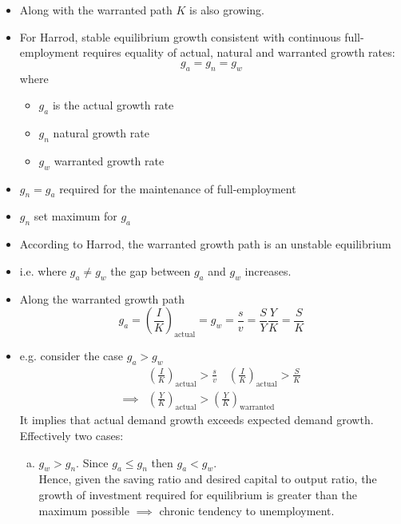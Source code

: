 \documentclass[a4paper,twoside]{article}
\numberwithin{equation}{section}
\numberwithin{figure}{section}
\begin{document}
\begin{itemize}
		\item Along with the warranted path \( K \) is also growing.
		\item For Harrod, stable equilibrium growth consistent with continuous full-employment requires equality of actual, natural and warranted growth rates:
		\begin{equation}
			g_a = g_n = g_w \label{eq:2.8}
		\end{equation}
		where
		\begin{itemize}
			\item \( g_a \) is the actual growth rate
			\item \( g_n \) natural growth rate
			\item \( g_w \) warranted growth rate
		\end{itemize}
		\item \( g_n = g_a \) required for the maintenance of full-employment
		\item \( g_n \) set maximum for \( g_a \)\\
		\item According to Harrod, the warranted growth path is an unstable equilibrium
		\item i.e. where \( g_a \neq g_w \) the gap between \( g_a \) and \( g_w \) increases.
		\item Along the warranted growth path
		\begin{equation}
			g_a = \left( \frac{I}{K} \right)_{\text{actual}} = g_w = \frac{s}{v} = \frac{S}{Y} \frac{Y}{K} = \frac{S}{K} \label{eq:2.9}
		\end{equation}
		\item e.g. consider the case \( g_a > g_w \) 
		\begin{align*}
			&\left( \frac{I}{K} \right)_{\text{actual}} > \frac{s}{v} \quad \left( \frac{I}{K} \right)_{\text{actual}} > \frac{S}{K} \\ 
			\implies &\left( \frac{Y}{K} \right)_{\text{actual}} > \left( \frac{Y}{K} \right)_{\text{warranted}}
		\end{align*}
		It implies that actual demand growth exceeds expected demand growth.
		Effectively two cases:
		\begin{enumerate}[(a)]
			\item \( g_w > g_n \). Since \( g_a \leq g_n \) then \( g_a < g_w \).\\
				Hence, given the saving ratio and desired capital to output ratio, the growth of investment required for equilibrium is greater than the maximum possible \( \implies \) chronic tendency to unemployment.

\end{enumerate}
\end{itemize}
\end{document}
